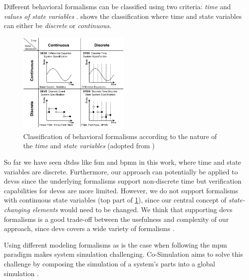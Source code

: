 \documentclass{jot}
\begin{document}
Different behavioral formalisms can be classified using two criteria: \textit{time} and \textit{values of state variables} \cite{wainerDiscreteeventModelingSimulation2009}.
 shows the classification where time and state variables can either be \textit{discrete} or \textit{continuous}.

\begin{figure}[ht!]
    \centering
    \includegraphics[width=0.49\textwidth]{figures/diagrams-classification.pdf}
    \caption{Classification of behavioral formalisms according to the nature of the \textit{time} and \textit{state variables} (adopted from \cite{wainerDiscreteeventModelingSimulation2009, amraniMultiparadigmModellingCyber2021})}
    \label{fig:classification}
\end{figure}

So far we have seen \glspl*{dtds} like \gls*{fsm} and \gls*{bpmn} in this work, where time and state variables are discrete.
Furthermore, our approach can potentially be applied to \glspl*{devs} since the underlying formalisms support non-discrete time but verification capabilities for \glspl*{devs} are more limited.
However, we do not support formalisms with continuous state variables (top part of \cref{fig:classification}), since our central concept of \textit{state-changing elements} would need to be changed.
We think that supporting \gls*{devs} formalisms is a good trade-off between the usefulness and complexity of our approach, since \gls*{devs} covers a wide variety of formalisms \cite{vangheluweIntroductionMultiparadigmModelling2002}.

Using different modeling formalisms as is the case when
following the \gls*{mpm} paradigm makes system simulation challenging.
Co-Simulation aims to solve this challenge by composing the simulation of a system's parts into a global simulation \cite{gomesCoSimulationSurvey2019}.
\end{document}
